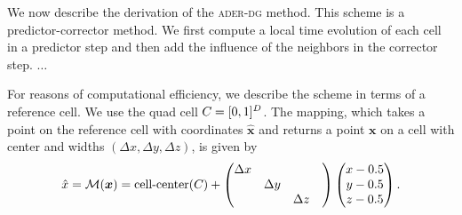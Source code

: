 
We now describe the derivation of the \textsc{ader-dg} method.
This scheme is a predictor-corrector method.
We first compute a local time evolution of each cell in a predictor step and then add the influence of the neighbors in the corrector step.
$\ldots$


\newcommand{\mapping}{\mathcal{M}}
\newcommand{\volume}{V}
For reasons of computational efficiency, we describe the scheme in terms of a reference cell.
We use the quad cell $C_{} = [0, 1]^D$.
The mapping, which takes a point on the reference cell with coordinates $\hat{\bm{x}}$ and returns a point $\bm{x}$ on a cell with center and widths $(\Delta x, \Delta y, \Delta z)$, is given by
\begin{equation}\label{eq:space-mapping}
  \hat{x} = \mapping (\bm{x}) =
  \operatorname{cell-center}(\cell) +
\begin{pmatrix}
\Delta x && \\
&\Delta y & \\
&&\Delta z&
\end{pmatrix}
  \begin{pmatrix}
    x - 0.5\\
    y - 0.5\\
    z - 0.5
  \end{pmatrix}.
\end{equation}

